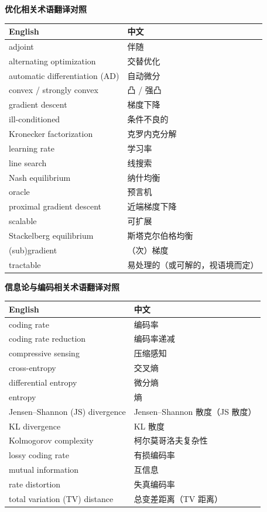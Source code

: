\bigskip 

\begin{center}
\textbf{优化相关术语翻译对照}

\vspace{0.3em}

\begin{tabular}{ll}
\hline
\textbf{English} & \textbf{中文} \\
\hline
adjoint & 伴随 \\
alternating optimization & 交替优化 \\
automatic differentiation (AD) & 自动微分 \\
convex / strongly convex & 凸 / 强凸 \\
gradient descent & 梯度下降 \\
ill-conditioned & 条件不良的 \\
Kronecker factorization & 克罗内克分解 \\
learning rate & 学习率 \\
line search & 线搜索 \\
Nash equilibrium & 纳什均衡 \\
oracle & 预言机 \\
proximal gradient descent & 近端梯度下降 \\
scalable & 可扩展 \\
Stackelberg equilibrium & 斯塔克尔伯格均衡 \\
(sub)gradient & （次）梯度 \\
tractable & 易处理的（或可解的，视语境而定） \\
\hline
\end{tabular}
\end{center}

\bigskip
\begin{center}
\textbf{信息论与编码相关术语翻译对照}

\vspace{0.3em}

\begin{tabular}{ll}
\hline
\textbf{English} & \textbf{中文} \\
\hline
coding rate & 编码率 \\
coding rate reduction & 编码率递减 \\
compressive sensing & 压缩感知 \\
cross-entropy & 交叉熵 \\
differential entropy & 微分熵 \\
entropy & 熵 \\
Jensen--Shannon (JS) divergence & Jensen--Shannon 散度（JS 散度） \\
KL divergence & KL 散度 \\
Kolmogorov complexity & 柯尔莫哥洛夫复杂性 \\
lossy coding rate & 有损编码率 \\
mutual information & 互信息 \\
rate distortion & 失真编码率 \\
total variation (TV) distance & 总变差距离（TV 距离） \\
\hline
\end{tabular}
\end{center}

